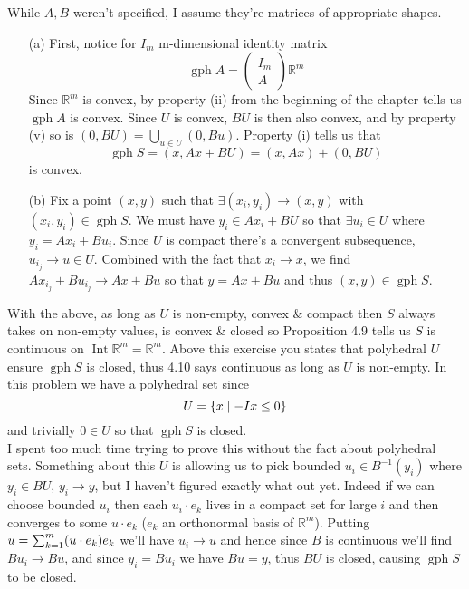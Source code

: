 \documentclass{article}
\newenvironment{ex}[1]
  {\renewcommand\theexercise{#1}\exercise}
  {\endexercise}
\DeclareMathOperator*{\gph}{gph}
\DeclareMathOperator*{\inte}{Int}
\newcommand{\R}[1]{\mathbb{R}^{#1}}
\newcommand{\pdot}[2]{\parens{#1 \cdot #2}}
\begin{document}
\begin{ex}{4.10} %
  While $A, B$ weren't specified, I assume they're matrices of appropriate shapes.
  \begin{enumerate}
    \item[(a)] First, notice for $I_m$ m-dimensional identity matrix
      $$
      \gph A = \begin{pmatrix}
        I_m \\
        A
      \end{pmatrix} \R{m}
      $$
      Since $\R{m}$ is convex, by property (ii) from the beginning of the chapter tells us $\gph A$ is convex. Since $U$ is convex, $BU$ is then also convex, and by property (v) so is $(0, BU) = \bigcup_{u \in U} (0, Bu)$. Property (i) tells us that
      $$
      \gph S = (x, Ax + BU) = (x, Ax) + (0, BU)
      $$
      is convex.
    \item[(b)] Fix a point $(x, y)$ such that $\exists (x_i, y_i) \to (x, y)$ with $(x_i, y_i) \in \gph S$. We must have $y_i \in Ax_i + BU$ so that $\exists u_i \in U$ where $y_i = Ax_i + Bu_i$. Since $U$ is compact there's a convergent subsequence, $u_{i_j} \to u \in U$. Combined with the fact that $x_i \to x$, we find $Ax_{i_j} + Bu_{i_j} \to Ax + Bu$ so that $y = Ax + Bu$ and thus $(x, y) \in \gph S$.
  \end{enumerate}
  With the above, as long as $U$ is non-empty, convex \& compact then $S$ always takes on non-empty values, is convex \& closed so Proposition 4.9 tells us $S$ is continuous on $\inte \R{m} = \R{m}$.
\end{ex} %
\begin{ex}{4.12} %
  Above this exercise you states that polyhedral $U$ ensure $\gph S$ is closed, thus 4.10 says continuous as long as $U$ is non-empty. In this problem we have a polyhedral set since
  $$
  U = \{ x \mid -I x \le 0 \}
  $$
  and trivially $0 \in U$ so that $\gph S$ is closed. \, \\

  I spent too much time trying to prove this without the fact about polyhedral sets. Something about this $U$ is allowing us to pick bounded $u_i \in B^{-1}(y_i)$ where $y_i \in BU$, $y_i \to y$, but I haven't figured exactly what out yet. Indeed if we can choose bounded $u_i$ then each $u_i \cdot e_k$ lives in a compact set for large $i$ and then converges to some $u \cdot e_k$ ($e_k$ an orthonormal basis of $\R{m}$). Putting $u = \sum_{k=1}^m \pdot{u}{e_k} e_k$ we'll have $u_i \to u$ and hence since $B$ is continuous we'll find $Bu_i \to Bu$, and since $y_i = Bu_i$ we have $Bu = y$, thus $BU$ is closed, causing $\gph S$ to be closed.
\end{ex} %
\end{document}
